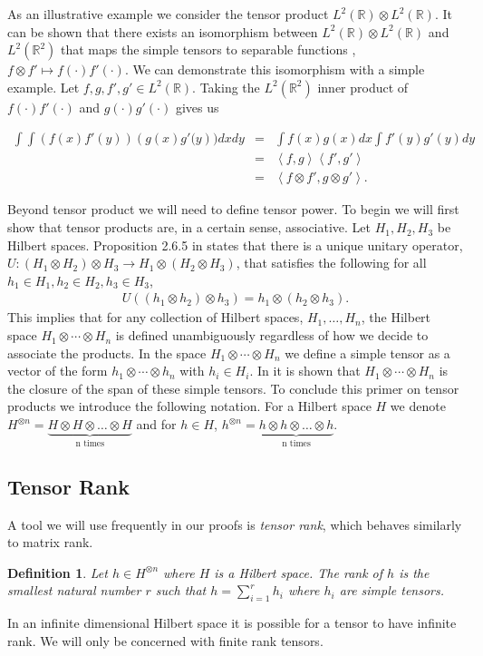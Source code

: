 \documentclass[aos,preprint]{imsart}
\def\rn{\mathbb{R}}
\def\l{\left}
\def\r{\right}
\theoremstyle{plain}
\theoremstyle{defintion}
\newtheorem{defin}{Definition}[section]
\begin{document}
	As an illustrative example we consider the tensor product $L^2\left( \rn \right) \otimes L^2\left( \rn \right)$. It can be shown that there exists an isomorphism between $L^2\left( \rn \right) \otimes L^2\left( \rn \right)$ and $L^2(\rn^2)$ that maps the simple tensors to separable functions \cite{kadison83}, $f \otimes f' \mapsto f(\cdot)f'(\cdot)$. We can demonstrate this isomorphism with a simple example. Let $f,g,f',g'\in L^2\left( \rn \right)$. Taking the $L^2(\rn^2)$ inner product of $f(\cdot)f'(\cdot)$ and $g(\cdot)g'(\cdot)$ gives us 

	\begin{eqnarray*}
		\int\int \l(f(x)f'(y)\r)\l(g(x)g'(y\r)) dx dy 
		&=& \int f(x)g(x) dx \int f'(y)g'(y) dy\\
	 &=& \l<f,g\r>  \l<f',g'\r>\\
	 &=& \l<f\otimes f', g \otimes g'\r>.
	\end{eqnarray*}

	Beyond tensor product we will need to define tensor power. To begin we will first show that tensor products are, in a certain sense, associative. Let $H_1, H_2, H_3$ be Hilbert spaces. Proposition 2.6.5 in \cite{kadison83} states that there is a unique unitary operator, $U: (H_1 \otimes H_2)\otimes H_3 \to H_1 \otimes (H_2 \otimes H_3)$, that satisfies the following for all $h_1 \in H_1, h_2 \in H_2, h_3 \in H_3$,
	\begin{eqnarray*}
		U\left( \left( h_1 \otimes h_2 \right)\otimes h_3 \right) = h_1 \otimes \left( h_2 \otimes h_3 \right).
	\end{eqnarray*}
	This implies that for any collection of Hilbert spaces, $H_1,\ldots , H_n$, the Hilbert space $H_1 \otimes \cdots \otimes H_n$ is defined unambiguously regardless of how we decide to associate the products. In the space $H_1 \otimes \cdots \otimes H_n$ we define a simple tensor as a vector of the form $h_1 \otimes\cdots\otimes h_n$ with $h_i \in H_i$. In \cite{kadison83} it is shown that $H_1 \otimes\cdots \otimes H_n$ is the closure of the span of these simple tensors. To conclude this primer on tensor products we introduce the following notation. For a Hilbert space $H$ we denote $H^{\otimes n}= \underbrace{H\otimes H \otimes \dots \otimes H}_\text{n times}$ and for $h \in H$, $h^{\otimes n}= \underbrace{h\otimes h \otimes \dots \otimes h}_\text{n times}$.
	\subsection{Tensor Rank}
	A tool we will use frequently in our proofs is {\em tensor rank}, which behaves similarly to matrix rank.
	\begin{defin} \label{def:tensrank}
		Let $h\in H^{\otimes n}$ where $H$ is a Hilbert space. The {\em rank} of $h$ is the smallest natural number $r$ such that $h =\sum_{i=1}^r h_i$ where $h_i$ are simple tensors.
	\end{defin}
	In an infinite dimensional Hilbert space it is possible for a tensor to have infinite rank. We will only be concerned with finite rank tensors.
\end{document}
